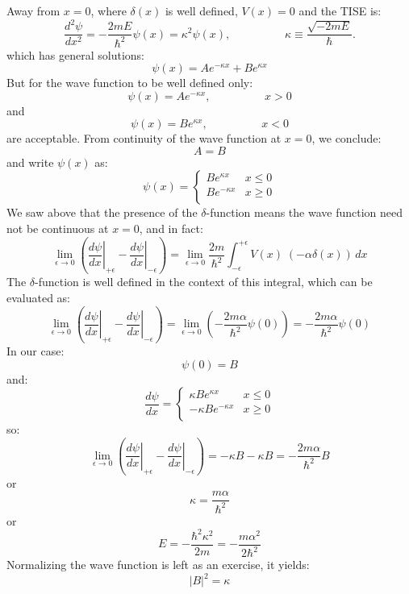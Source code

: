 \documentclass[12pt]{book}
\begin{document}
Away from $x=0$, where $\delta(x)$ is well defined, $V(x)=0$ and the TISE is:
\begin{equation*}
\frac{d^2 \psi}{d x^2} = -\frac{2mE}{\hbar^2}\psi(x) = \kappa^2 \psi(x), \hspace{2cm} \kappa \equiv \frac{\sqrt{-2mE}}{\hbar}.
\end{equation*}
which has general solutions:
$$\psi(x) = A e^{\displaystyle - \kappa x} + B e^{\displaystyle \kappa x}$$
But for the wave function to be well defined only:
$$\psi(x) = A e^{\displaystyle - \kappa x}, \hspace{2cm} x>0$$ 
and
$$\psi(x) = B e^{\displaystyle \kappa x}, \hspace{2cm} x<0$$
are acceptable.  From continuity of the wave function at $x=0$, we conclude:
$$A=B$$
and write $\psi(x)$ as:
$$\psi(x) = \begin{cases}
B e^{\displaystyle \kappa x} &  x\leq0 \\
B e^{\displaystyle -\kappa x} &  x\geq0 \\
\end{cases}
$$
We saw above that the presence of the $\delta$-function means the wave function need not be continuous at $x=0$, and in fact:
$$
\lim_{\epsilon \to 0} \left( \left. \frac{d\psi}{d x} \right\rvert_{+\epsilon} 
- \left. \frac{d\psi}{d x} \right\rvert_{-\epsilon} \right) = 
\lim_{\epsilon \to 0}
\frac{2m}{\hbar^2}\int_{-\epsilon}^{+\epsilon} V(x) \; \left( -\alpha \delta(x) \right) \, dx
$$
The $\delta$-function is well defined in the context of this integral, which can be evaluated as:
$$
\lim_{\epsilon \to 0} \left( \left. \frac{d\psi}{d x} \right\rvert_{+\epsilon} 
- \left. \frac{d\psi}{d x} \right\rvert_{-\epsilon} \right) = 
\lim_{\epsilon \to 0} \left( -\frac{2m\alpha}{\hbar^2} \psi(0) \right) = -\frac{2m\alpha}{\hbar^2} \psi(0) 
$$
In our case:
$$\psi(0) = B$$
and:
$$\frac{d\psi}{dx} = \begin{cases}
\kappa B e^{\displaystyle \kappa x} &  x\leq0 \\
-\kappa B e^{\displaystyle -\kappa x} &  x\geq0 \\
\end{cases}
$$
so:
$$
\lim_{\epsilon \to 0} \left( \left. \frac{d\psi}{d x} \right\rvert_{+\epsilon} 
- \left. \frac{d\psi}{d x} \right\rvert_{-\epsilon} \right) = -\kappa B - \kappa B = 
-\frac{2m\alpha}{\hbar^2} B 
$$
or
$$\kappa = \frac{m\alpha}{\hbar^2}$$
or
$$E = -\frac{\hbar^2 \kappa^2}{2m} = - \frac{m\alpha^2}{2\hbar^2}$$
Normalizing the wave function is left as an exercise, it yields:
$$|B|^2 = \kappa$$
\end{document}

